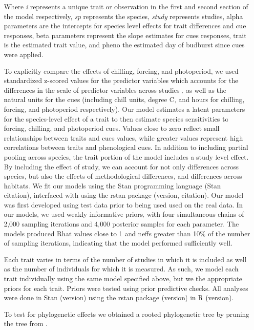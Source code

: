 \documentclass{article}\usepackage[]{graphicx}\usepackage[]{color}
\begin{document}
Where \emph{i} represents a unique trait or observation in the first and second section of the model respectively, \emph{sp} represents the species, \emph{study} represents studies, alpha parameters are the intercepts for species level effects for trait differences and cue responses, beta parameters represent the slope estimates for cues responses, trait is the estimated trait value, and pheno the estimated day of budburst since cues were applied. %

To explicitly compare the effects of chilling, forcing, and photoperiod, we used standardized z-scored values for the predictor variables which accounts for the differences in the scale of predictor variables across studies \citep{Gelman2006}, as well as the natural units for the cues (including chill units, degree C, and hours for chilling, forcing, and photoperiod respectively). Our model estimates a latent parameters for the species-level effect of a trait to then estimate species sensitivities to forcing, chilling, and photoperiod cues. Values close to zero reflect small relationships between traits and cues values, while greater values represent high correlations between traits and phenological cues. In addition to including partial pooling across species, the trait portion of the model includes a study level effect. By including the effect of study, we can account for not only differences across species, but also the effects of methodological differences, and differences across habitats. We fit our models using the Stan programming language (Stan citation), interfaced with using the rstan package (version, citation). Our model was first developed using test data prior to being used used on the real data. In our models, we used weakly informative priors, with four simultaneous chains of 2,000 sampling iterations and 4,000 posterior samples for each parameter. The models produced Rhat values close to 1 and neffs greater than 10\% of the number of sampling iterations, indicating that the model performed sufficiently well. 


Each trait varies in terms of the number of studies in which it is included as well as the number of individuals for which it is measured. As such, we model each trait individually using the same model specified above, but we the appropriate priors for each trait. Priors were tested using prior predictive checks. All analyses were done in Stan (version) using the rstan package (version) in R (version). 

To test for phylogenetic effects we obtained a rooted phylogenetic tree by pruning the tree from \citep{Smith2018}.
\end{document}
